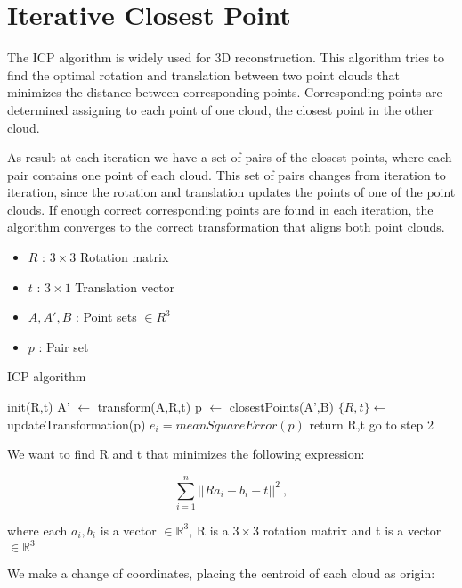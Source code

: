 
\section{Iterative Closest Point}

The ICP algorithm \cite{mckay92} is widely used for 3D reconstruction. This algorithm tries to find 
the optimal rotation and translation between two point clouds that minimizes the distance between corresponding 
points. Corresponding points are determined assigning to each point of one cloud, the closest point in the other cloud.

As result at each iteration we have a set of pairs of the closest points, where each pair contains one point of each cloud. This set 
of pairs changes from iteration to iteration, since the rotation and translation updates the points of one of the point clouds. If enough correct 
corresponding points are found in each iteration, the algorithm converges to the correct transformation that aligns both point clouds.


\begin{itemize}
\item $R$ : $3\times3$ Rotation matrix
\item $t$ : $3\times1$ Translation vector
\item $A,A',B$ : Point sets $\in R^3$
\item $p$ : Pair set
\end{itemize}
\begin{algorithm}
\caption{ICP algorithm}
\begin{algorithmic}[1]
\State init(R,t)
\State A' $\leftarrow$ transform(A,R,t) 
\State p $\leftarrow$ closestPoints(A',B)
\State $\{R,t\} \gets$ updateTransformation(p)
\State $e_i = meanSquareError(p)$
	\State return R,t
\Else
	\State go to step 2
\EndIf
\end{algorithmic}
\end{algorithm}


We want to find R and t that minimizes the following expression:

$$ \sum\limits_{i=1}^n ||R a_i -  b_i - t ||^2 \ ,$$

\noindent where each $a_i,b_i$ is a vector $\in \mathbb{R}^3$, R is a $3\times3$ rotation matrix and t is a vector $\in \mathbb{R}^3$


We make a change of coordinates, placing the centroid of each cloud as origin:



